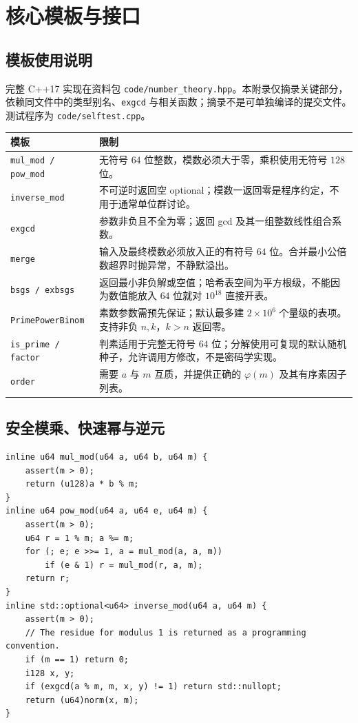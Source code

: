 \documentclass[UTF8,a4paper,11pt,oneside,openany,fontset=fandol]{ctexbook}
\theoremstyle{definition}
\begin{document}
\appendix
\chapter{核心模板与接口}
\section{模板使用说明}
完整 C++17 实现在资料包 \texttt{code/number\_theory.hpp}。本附录仅摘录关键部分，依赖同文件中的类型别名、\texttt{exgcd} 与相关函数；摘录不是可单独编译的提交文件。测试程序为 \texttt{code/selftest.cpp}。

\begin{longtable}{p{}p{}}
\toprule
模板 & 限制\\\midrule
\texttt{mul\_mod / pow\_mod} & 无符号 $64$ 位整数，模数必须大于零，乘积使用无符号 $128$ 位。\\
\texttt{inverse\_mod} & 不可逆时返回空 optional；模数一返回零是程序约定，不用于通常单位群讨论。\\
\texttt{exgcd} & 参数非负且不全为零；返回 gcd 及其一组整数线性组合系数。\\
\texttt{merge} & 输入及最终模数必须放入正的有符号 $64$ 位。合并最小公倍数超界时抛异常，不静默溢出。\\
\texttt{bsgs / exbsgs} & 返回最小非负解或空值；哈希表空间为平方根级，不能因为数值能放入 $64$ 位就对 $10^{18}$ 直接开表。\\
\texttt{PrimePowerBinom} & 素数参数需预先保证；默认最多建 $2\times10^6$ 个量级的表项。支持非负 $n,k$，$k>n$ 返回零。\\
\texttt{is\_prime / factor} & 判素适用于完整无符号 $64$ 位；分解使用可复现的默认随机种子，允许调用方修改，不是密码学实现。\\
\texttt{order} & 需要 $a$ 与 $m$ 互质，并提供正确的 $\varphi(m)$ 及其有序素因子列表。\\
\bottomrule
\end{longtable}

\section{安全模乘、快速幂与逆元}
\begin{lstlisting}
inline u64 mul_mod(u64 a, u64 b, u64 m) {
    assert(m > 0);
    return (u128)a * b % m;
}
inline u64 pow_mod(u64 a, u64 e, u64 m) {
    assert(m > 0);
    u64 r = 1 % m; a %= m;
    for (; e; e >>= 1, a = mul_mod(a, a, m))
        if (e & 1) r = mul_mod(r, a, m);
    return r;
}
inline std::optional<u64> inverse_mod(u64 a, u64 m) {
    assert(m > 0);
    // The residue for modulus 1 is returned as a programming convention.
    if (m == 1) return 0;
    i128 x, y;
    if (exgcd(a % m, m, x, y) != 1) return std::nullopt;
    return (u64)norm(x, m);
}
\end{lstlisting}
\end{document}
